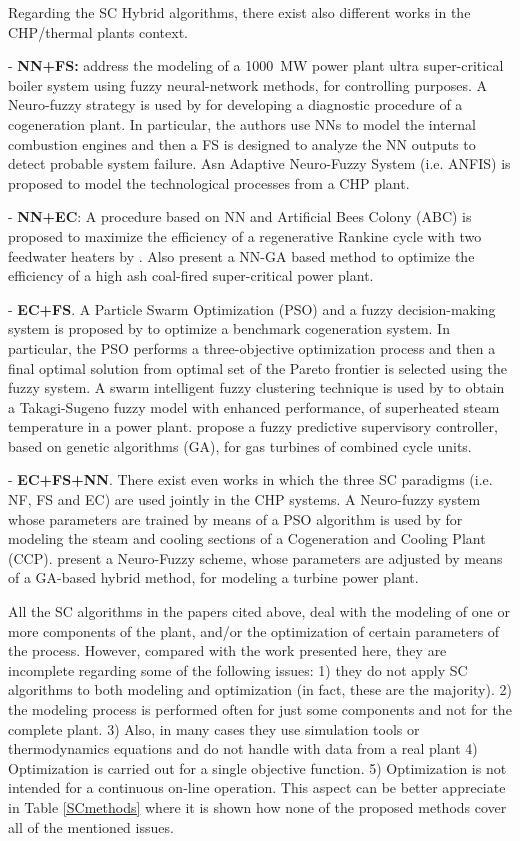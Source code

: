 Regarding the SC Hybrid algorithms, there exist also different works in the CHP/thermal plants context. 

- \textbf{NN+FS:} \cite{Liu2010} address the modeling of a \SI{1000}{MW} power plant ultra super-critical boiler system using fuzzy neural-network methods, for controlling purposes. A Neuro-fuzzy strategy is used by \cite{Bare-2005} for developing a diagnostic procedure of a cogeneration plant. In particular, the authors use NNs to model the internal combustion engines and then a FS is designed to analyze the NN outputs to detect probable system failure. Asn Adaptive Neuro-Fuzzy System (i.e. ANFIS) is proposed \cite{Mastacan-2005} to model the technological processes from a CHP plant.

- \textbf{NN+EC}: A procedure based on NN and Artificial Bees Colony (ABC) is proposed to maximize the efficiency of a regenerative Rankine cycle with two feedwater heaters by \cite{Rashidi-2011}. Also \cite{Suresh-2011} present a NN-GA based method to optimize the efficiency of a high ash coal-fired super-critical power plant.

- \textbf{EC+FS}. A Particle Swarm Optimization (PSO) and a fuzzy decision-making system is proposed by \cite{Sayyaadi-2011} to optimize a benchmark cogeneration system. In particular, the PSO performs a three-objective optimization process and then a final optimal solution from optimal set of the Pareto frontier is selected using the fuzzy system. A swarm intelligent fuzzy clustering technique is used by \cite{Su-12} to obtain a Takagi-Sugeno fuzzy model with enhanced performance, of  superheated steam temperature in a power plant. \cite{Saez-2007} propose a fuzzy predictive supervisory controller, based on genetic algorithms (GA), for gas turbines of combined cycle units.

- \textbf{EC+FS+NN}.  There exist even works in which the three SC paradigms (i.e. NF, FS and EC) are used jointly in the CHP systems. A Neuro-fuzzy system whose parameters are trained by means of a PSO  algorithm is used by \cite{Tamiru-2009} for modeling  the steam and cooling sections of a Cogeneration and Cooling Plant (CCP). \cite{Kwun-2007} present a Neuro-Fuzzy scheme, whose parameters are adjusted by means of a GA-based hybrid method, for modeling a turbine power plant. 

All the SC algorithms in the papers cited above, deal with the modeling of one or more components of the plant, and/or the optimization of certain parameters of the process. However, compared with the work presented here, they are incomplete regarding some of the following issues: 1) they do not apply SC algorithms to both modeling and optimization (in fact, these are the majority). 2) the modeling process is performed often for just some components and not for the complete plant. 3) Also, in many cases they use simulation tools or thermodynamics equations and do not handle with data from a real plant 4) Optimization is carried out for a single objective function. 5) Optimization is not intended for a continuous on-line operation. This aspect can be better appreciate in Table \ref{SCmethods} where it is shown how none of the proposed methods cover all of the mentioned issues.


